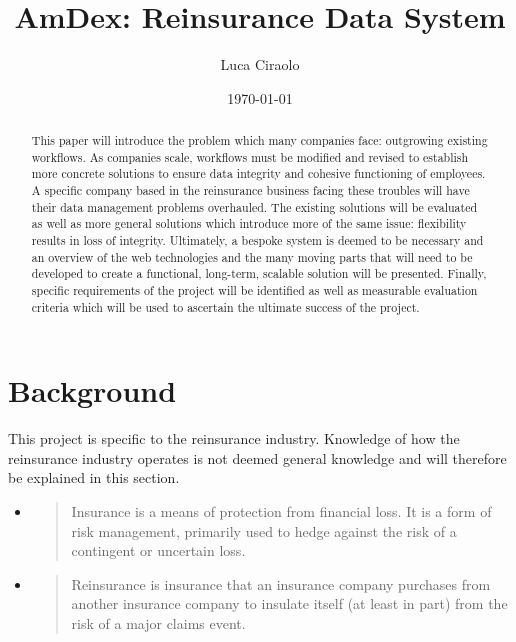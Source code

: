 \documentclass[12pt]{article}
\title{AmDex: Reinsurance Data System}
\author{Luca Ciraolo}
\date{\today}
\begin{document}
\maketitle
\begin{abstract}
    This paper will introduce the problem which many companies face: outgrowing existing workflows. As companies scale, workflows must be modified and revised to establish more concrete solutions to ensure data integrity and cohesive functioning of employees. A specific company based in the reinsurance business facing these troubles will have their data management problems overhauled. The existing solutions will be evaluated as well as more general solutions which introduce more of the same issue: flexibility results in loss of integrity. Ultimately, a bespoke system is deemed to be necessary and an overview of the web technologies and the many moving parts that will need to be developed to create a functional, long-term, scalable solution will be presented. Finally, specific requirements of the project will be identified as well as measurable evaluation criteria which will be used to ascertain the ultimate success of the project.
\end{abstract}
\newpage

\tableofcontents
\newpage

\section{Background}
This project is specific to the reinsurance industry. Knowledge of how the reinsurance industry operates is not deemed general knowledge and will therefore be explained in this section.

\begin{itemize}
    \item \blockquote[\cite{wikipedia_insurance}]{Insurance is a means of protection from financial loss. It is a form of risk management, primarily used to hedge against the risk of a contingent or uncertain loss.}
    \item \blockquote[\cite{wikipedia_reinsurance}]{Reinsurance is insurance that an insurance company purchases from another insurance company to insulate itself (at least in part) from the risk of a major claims event.}
\end{itemize}
\end{document}
